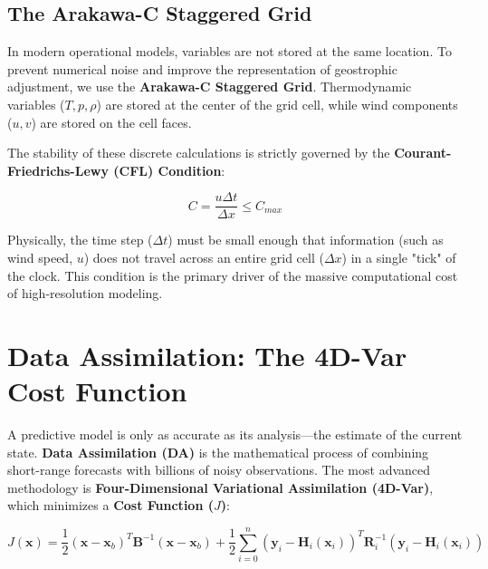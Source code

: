 \subsection{The Arakawa-C Staggered Grid}
In modern operational models, variables are not stored at the same location. To prevent numerical noise and improve the representation of geostrophic adjustment, we use the \textbf{Arakawa-C Staggered Grid}. Thermodynamic variables ($T, p, \rho$) are stored at the center of the grid cell, while wind components ($u, v$) are stored on the cell faces.

\begin{algorithm}[H]
\caption{Arakawa-C Staggered Gradient Calculation}
\SetAlgoLined
{}
\end{algorithm}

The stability of these discrete calculations is strictly governed by the \textbf{Courant-Friedrichs-Lewy (CFL) Condition}:

\begin{equation}
C = \frac{u \Delta t}{\Delta x} \le C_{max}
\end{equation}

Physically, the time step ($\Delta t$) must be small enough that information (such as wind speed, $u$) does not travel across an entire grid cell ($\Delta x$) in a single "tick" of the clock. This condition is the primary driver of the massive computational cost of high-resolution modeling.

\section{Data Assimilation: The 4D-Var Cost Function}

A predictive model is only as accurate as its analysis—the estimate of the current state. \textbf{Data Assimilation (DA)} is the mathematical process of combining short-range forecasts with billions of noisy observations. The most advanced methodology is \textbf{Four-Dimensional Variational Assimilation (4D-Var)}, which minimizes a \textbf{Cost Function ($J$)}:

\begin{equation}
J(\mathbf{x}) = \frac{1}{2}(\mathbf{x} - \mathbf{x}_b)^T \mathbf{B}^{-1} (\mathbf{x} - \mathbf{x}_b) + \frac{1}{2}\sum_{i=0}^{n} (\mathbf{y}_i - \mathbf{H}_i(\mathbf{x}_i))^T \mathbf{R}_i^{-1} (\mathbf{y}_i - \mathbf{H}_i(\mathbf{x}_i))
\end{equation}

